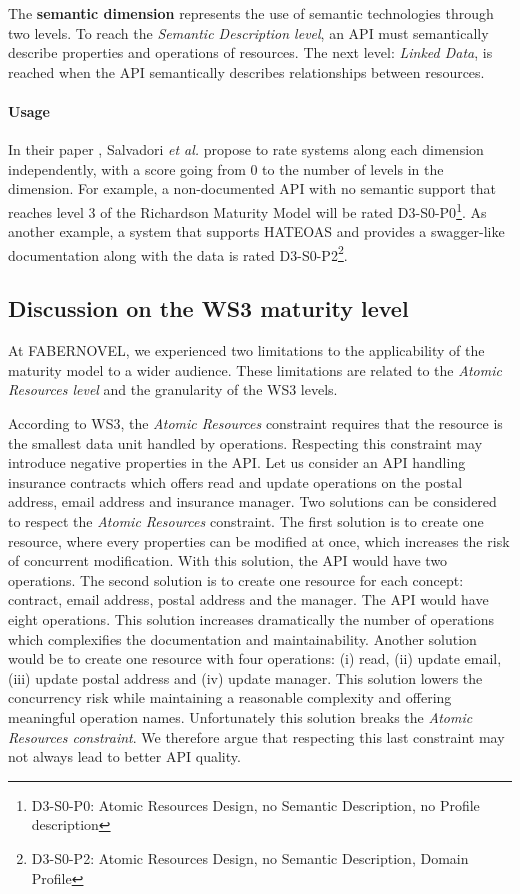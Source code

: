 The \textbf{semantic dimension} represents the use of semantic technologies through two levels. To reach the \textit{Semantic Description level}, an API must semantically describe properties and operations of resources. The next level: \textit{Linked Data}, is reached when the API semantically describes relationships between resources.

\paragraph{Usage}
In their paper \cite{7195633}, Salvadori \emph{et al.} propose to rate systems along each dimension independently, with a score going from 0 to the number of levels in the dimension.
For example, a non-documented API with no semantic support that reaches level 3 of the Richardson Maturity Model will be rated D3-S0-P0\footnote{D3-S0-P0: Atomic Resources Design, no Semantic Description, no Profile description}. As another example, a system that supports HATEOAS and provides a swagger-like documentation along with the data is rated D3-S0-P2\footnote{D3-S0-P2: Atomic Resources Design, no Semantic Description, Domain Profile}.
\vspace*{-0.5cm}
\subsection{Discussion on the WS3 maturity level}
\vspace*{-0.2cm}

At FABERNOVEL, we experienced two limitations to the applicability of the maturity model to a wider audience. These limitations are related to the \textit{Atomic Resources level} and the granularity of the WS3 levels.

According to WS3, the \textit{Atomic Resources} constraint requires that the resource is the smallest data unit handled by operations.
Respecting this constraint may introduce negative properties in the API.
Let us consider an API handling insurance contracts which offers read and update operations on the postal address, email address and insurance manager. 
Two solutions can be considered to respect the \textit{Atomic Resources} constraint. 
The first solution is to create one resource, where every properties can be modified at once, which increases the risk of concurrent modification. 
With this solution, the API would have two operations. 
The second solution is to create one resource for each concept: contract, email address, postal address and the manager. The API would have eight operations. This solution increases dramatically the number of operations which complexifies the documentation and maintainability.
Another solution would be to create one resource with four operations: (i) read, (ii) update email, (iii) update postal address and (iv) update manager. 
This solution lowers the concurrency risk while maintaining a reasonable complexity and offering meaningful operation names. Unfortunately this solution breaks the \textit{Atomic Resources constraint}. We therefore argue that respecting this last constraint may not always lead to better API quality.

